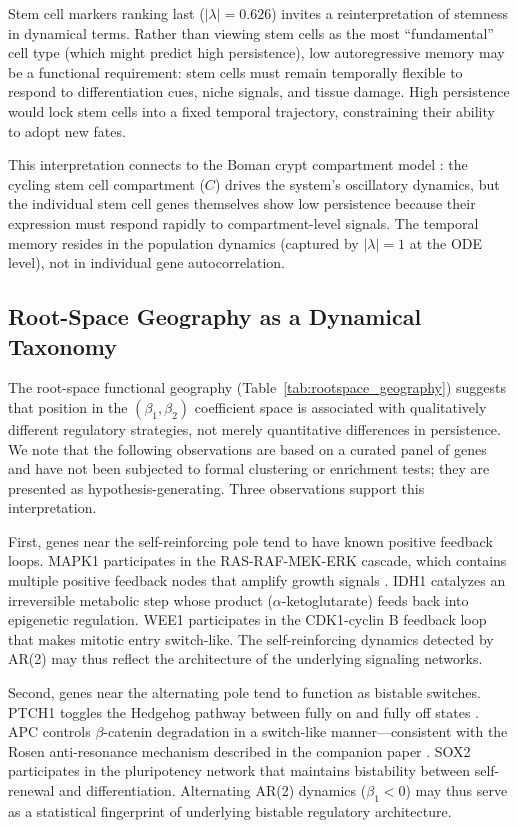 \documentclass[11pt,letterpaper]{article}
\begin{document}
Stem cell markers ranking last ($|\lambda| = 0.626$) invites a reinterpretation of stemness in dynamical terms. Rather than viewing stem cells as the most ``fundamental'' cell type (which might predict high persistence), low autoregressive memory may be a functional requirement: stem cells must remain temporally flexible to respond to differentiation cues, niche signals, and tissue damage. High persistence would lock stem cells into a fixed temporal trajectory, constraining their ability to adopt new fates.

This interpretation connects to the Boman crypt compartment model \citep{boman2025}: the cycling stem cell compartment ($C$) drives the system's oscillatory dynamics, but the individual stem cell genes themselves show low persistence because their expression must respond rapidly to compartment-level signals. The temporal memory resides in the population dynamics (captured by $|\lambda| = 1$ at the ODE level), not in individual gene autocorrelation.

\subsection{Root-Space Geography as a Dynamical Taxonomy}

The root-space functional geography (Table~\ref{tab:rootspace_geography}) suggests that position in the $(\beta_1, \beta_2)$ coefficient space is associated with qualitatively different regulatory strategies, not merely quantitative differences in persistence. We note that the following observations are based on a curated panel of genes and have not been subjected to formal clustering or enrichment tests; they are presented as hypothesis-generating. Three observations support this interpretation.

First, genes near the self-reinforcing pole tend to have known positive feedback loops. MAPK1 participates in the RAS-RAF-MEK-ERK cascade, which contains multiple positive feedback nodes that amplify growth signals \citep{kolch2005}. IDH1 catalyzes an irreversible metabolic step whose product ($\alpha$-ketoglutarate) feeds back into epigenetic regulation. WEE1 participates in the CDK1-cyclin B feedback loop that makes mitotic entry switch-like. The self-reinforcing dynamics detected by AR(2) may thus reflect the architecture of the underlying signaling networks.

Second, genes near the alternating pole tend to function as bistable switches. PTCH1 toggles the Hedgehog pathway between fully on and fully off states \citep{briscoe2013}. APC controls $\beta$-catenin degradation in a switch-like manner---consistent with the Rosen anti-resonance mechanism \citep{rosen2026} described in the companion paper \citep{whiteside2026paper2}. SOX2 participates in the pluripotency network that maintains bistability between self-renewal and differentiation. Alternating AR(2) dynamics ($\beta_1 < 0$) may thus serve as a statistical fingerprint of underlying bistable regulatory architecture.
\end{document}
